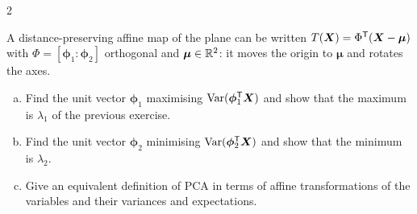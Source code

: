 \begin{paracol}{2}
\begin{exercise}\label{ch07:ex-ps7-2}
A distance-preserving affine map of the plane can be written $T(\bm X)=\Phi^{\mathsf T}(\bm X-\bm\mu)$ with $\Phi=[\bm\phi_1:\bm\phi_2]$
orthogonal and $\bm\mu\in\mathbb{R}^2$: it moves the origin to $\bm\mu$ and rotates the axes.
\begin{enumerate}[(a)]
  \item Find the unit vector $\bm\phi_1$ maximising $\operatorname{Var}(\bm\phi_1^{\mathsf T}\bm X)$ and show that the maximum is $\lambda_1$ of the previous
      exercise.
  \item Find the unit vector $\bm\phi_2$ minimising $\operatorname{Var}(\bm\phi_2^{\mathsf T}\bm X)$ and show that the minimum is $\lambda_2$.
  \item Give an equivalent definition of PCA in terms of affine transformations of the variables and their
      variances and expectations.
\end{enumerate}
\end{exercise}


\end{paracol}
